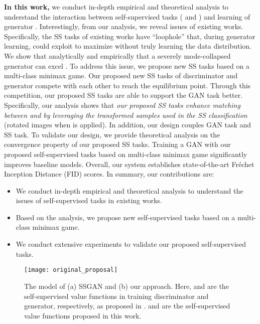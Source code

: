 \documentclass{article}
\begin{document}
{\bf In this work,} we conduct in-depth empirical and theoretical analysis to understand the interaction between self-supervised tasks ( and ) and learning of generator .
Interestingly, from our analysis,
we reveal issues of existing works. 
Specifically, 
the SS tasks of existing works have ``loophole'' that, during generator learning,  could exploit to maximize  without truly learning the data distribution. We show that analytically and empirically that a severely mode-collapsed generator can excel . 
To address this issue, we
propose new SS tasks based on a multi-class minimax game.
Our proposed new SS tasks of discriminator and generator 
compete with each other to reach the equilibrium point. Through this competition, our proposed SS tasks are able to support the GAN task better. Specifically, our analysis shows that {\em our proposed SS tasks enhance matching between  and  by leveraging the transformed samples used in the SS classification} (rotated images when 
\cite{gidaris-iclr-2018} is applied).
In addition, our design couples GAN task and SS task. To validate our design, 
we provide theoretical analysis on the convergence property of our proposed SS tasks. Training a GAN with our proposed self-supervised tasks based on multi-class minimax game significantly improves baseline models. Overall, our system  establishes state-of-the-art Fr{\'e}chet Inception Distance (FID) scores.
In summary, our contributions are:
\begin{itemize}
	\item We conduct in-depth empirical and theoretical analysis to understand the issues of self-supervised tasks in existing works.
	\item Based on the analysis, we propose new self-supervised tasks based on a multi-class minimax game.
	\item We conduct extensive experiments to validate our proposed self-supervised tasks.
\end{itemize}

\begin{figure}
  \centering
\texttt{[image: original\_proposal]}
\caption{The model of (a) SSGAN \cite{chen-arxiv-2018} and (b) our approach. Here,  and  are the self-supervised value functions in training discriminator and generator, respectively, as proposed in \cite{chen-arxiv-2018}.  and  are the self-supervised value functions proposed in this work.}
  \label{proposed_model}
  \vspace{-0.4cm}
\end{figure}
\end{document}
